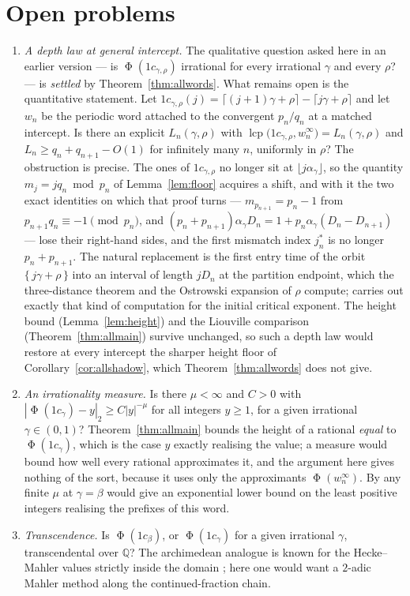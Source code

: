\documentclass[11pt,reqno]{amsart}
\theoremstyle{plain}
\theoremstyle{definition}
\newcommand{\Q}{\mathbb{Q}}
\newcommand{\lcp}{\operatorname{lcp}}
\DeclareMathOperator{\Ph}{\Phi}
\begin{document}
\section{Open problems}\label{sec:open}

\begin{enumerate}
\item \emph{A depth law at general intercept.} The qualitative question asked
here in an earlier version --- is $\Ph(1c_{\gamma,\rho})$ irrational for every
irrational $\gamma$ and every $\rho$? --- is \emph{settled} by
Theorem~\ref{thm:allwords}. What remains open is the quantitative statement.
Let $1c_{\gamma,\rho}(j)=\lceil (j+1)\gamma+\rho\rceil-\lceil j\gamma+\rho\rceil$
and let $w_n$ be the periodic word attached to the convergent $p_n/q_n$ at a
matched intercept. Is there an explicit $L_n(\gamma,\rho)$ with
$\lcp\bigl(1c_{\gamma,\rho},w_n^\infty\bigr)=L_n(\gamma,\rho)$ and
$L_n\ge q_n+q_{n+1}-O(1)$ for infinitely many $n$, uniformly in $\rho$? The
obstruction is precise. The ones of $1c_{\gamma,\rho}$ no longer sit at
$\lfloor j\alpha_\gamma\rfloor$, so the quantity $m_j=jq_n\bmod p_n$ of
Lemma~\ref{lem:floor} acquires a shift, and with it the two exact identities on
which that proof turns --- $m_{p_{n+1}}=p_n-1$ from
$p_{n+1}q_n\equiv-1\pmod{p_n}$, and
$(p_n+p_{n+1})\alpha_\gamma D_n=1+p_n\alpha_\gamma(D_n-D_{n+1})$ --- lose their
right-hand sides, and the first mismatch index $j^{*}_n$ is no longer
$p_n+p_{n+1}$. The natural replacement is the first entry time of the orbit
$\{\,j\gamma+\rho\,\}$ into an interval of length $jD_n$ at the partition
endpoint, which the three-distance theorem and the Ostrowski expansion of $\rho$
compute; \cite{BertheHoltonZamboni2006} carries out exactly that kind of
computation for the initial critical exponent. The height bound
(Lemma~\ref{lem:height}) and the Liouville comparison
(Theorem~\ref{thm:allmain}) survive unchanged, so such a depth law would restore
at every intercept the sharper height floor of Corollary~\ref{cor:allshadow},
which Theorem~\ref{thm:allwords} does not give.
\item \emph{An irrationality measure.} Is there $\mu<\infty$ and $C>0$ with
$|\Ph(1c_\gamma)-y|_2\ge C|y|^{-\mu}$ for all integers $y\ge1$, for a given
irrational $\gamma\in(0,1)$? Theorem~\ref{thm:allmain} bounds the height of a
rational \emph{equal} to $\Ph(1c_\gamma)$, which is the case $y$ exactly
realising the value; a measure would bound how well every rational approximates
it, and the argument here gives nothing of the sort, because it uses only the
approximants $\Ph(w_n^\infty)$. By \cite[Theorem~5.2]{DeJesusB} any finite
$\mu$ at $\gamma=\beta$ would give an exponential lower bound on the least
positive integers realising the prefixes of this word.
\item \emph{Transcendence.} Is $\Ph(1c_\beta)$, or $\Ph(1c_\gamma)$ for a given
irrational $\gamma$, transcendental over $\Q$? The
archimedean analogue is known for the Hecke--Mahler values strictly inside the
domain \cite{BugeaudLaurent2023}; here one would want a $2$-adic Mahler method
along the continued-fraction chain.
\end{enumerate}
\end{document}
